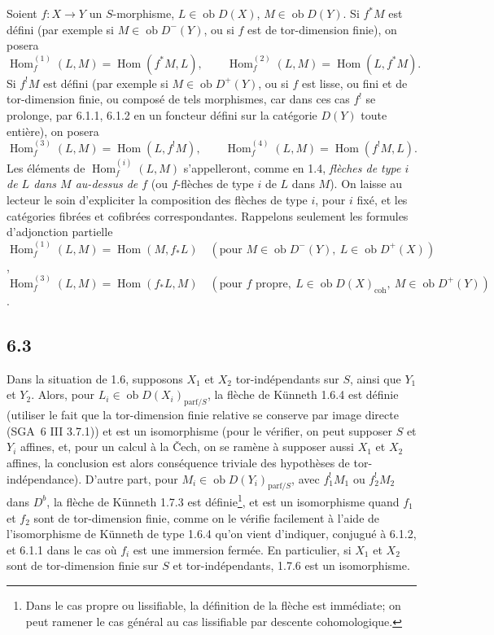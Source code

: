 \documentclass[11pt]{article}
\DeclareMathOperator{\Hom}{Hom}
\providecommand{\Hom}{\operatorname{Hom}}
\providecommand{\Hom}{\operatorname{Hom}}
\begin{document}
Soient $f:X\to Y$ un $S$-morphisme, $L\in\operatorname{ob}D(X)$, $M\in\operatorname{ob}D(Y)$. Si $f^*M$ est défini (par exemple si $M\in\operatorname{ob}D^-(Y)$, ou si $f$ est de tor-dimension finie), on posera
\[
\Hom_f^{(1)}(L,M)=\Hom(f^*M,L),\qquad
\Hom_f^{(2)}(L,M)=\Hom(L,f^*M).
\]
Si $f^!M$ est défini (par exemple si $M\in\operatorname{ob}D^+(Y)$, ou si $f$ est lisse, ou fini et de tor-dimension finie, ou composé de tels morphismes, car dans ces cas $f^!$ se
prolonge, par 6.1.1, 6.1.2 en un foncteur défini sur la catégorie $D(Y)$ toute entière), on posera
\[
\Hom_f^{(3)}(L,M)=\Hom(L,f^!M),\qquad
\Hom_f^{(4)}(L,M)=\Hom(f^!M,L).
\]
Les éléments de $\Hom_f^{(i)}(L,M)$ s'appelleront, comme en 1.4, \emph{flèches de type $i$ de $L$ dans $M$ au-dessus de $f$} (ou $f$-flèches de type $i$ de $L$ dans $M$). On laisse au lecteur le soin d'expliciter la composition des flèches de type $i$, pour $i$ fixé, et les catégories fibrées et cofibrées correspondantes. Rappelons seulement les formules d'adjonction partielle $\Hom_f^{(1)}(L,M)=\Hom(M,f_*L)\quad(\text{pour }M\in\operatorname{ob}D^{-}(Y),\ L\in\operatorname{ob}D^+(X))$, $\Hom_f^{(3)}(L,M)=\Hom(f_*L,M)\quad(\text{pour }f\text{ propre},\ L\in\operatorname{ob}D(X)_{\mathrm{coh}},\ M\in\operatorname{ob}D^+(Y))$.

\subsection*{6.3}
Dans la situation de 1.6, supposons $X_1$ et $X_2$ tor-indépendants sur $S$, ainsi que $Y_1$ et $Y_2$. Alors, pour $L_i\in\operatorname{ob}D(X_i)_{\mathrm{parf}/S}$, la flèche de Künneth 1.6.4 est définie (utiliser le fait que la tor-dimension finie relative se conserve par image directe (SGA~6 III 3.7.1)) et est un isomorphisme (pour le vérifier, on peut supposer $S$ et $Y_i$ affines, et, pour un calcul à la Čech, on se ramène à supposer aussi $X_1$ et $X_2$ affines, la conclusion est alors conséquence triviale des hypothèses de tor-indépendance). D'autre part, pour $M_i\in\operatorname{ob}D(Y_i)_{\mathrm{parf}/S}$, avec $f_1^!M_1$ ou $f_2^!M_2$ dans $D^b$, la flèche de Künneth 1.7.3 est définie\footnote{Dans le cas propre ou lissifiable, la définition de la flèche est immédiate; on peut ramener le cas général au cas lissifiable par descente cohomologique.}, et est un isomorphisme quand $f_1$ et $f_2$ sont de tor-dimension finie, comme on le vérifie facilement à l'aide de l'isomorphisme de Künneth de type 1.6.4 qu'on vient d'indiquer, conjugué à 6.1.2, et 6.1.1 dans le cas où $f_i$ est une immersion fermée. En particulier, si $X_1$ et $X_2$ sont de tor-dimension finie sur $S$ et tor-indépendants, 1.7.6 est un isomorphisme.
\end{document}
